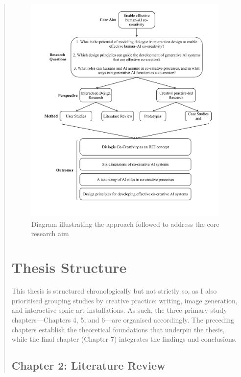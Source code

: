 \begin{quote}
\begin{figure}[hbt!]
    \centering
    \includegraphics[width=1\linewidth]{Intro - Frame 1 (2).jpg}
    \caption{Diagram illustrating the approach followed to address the core research aim}
    \label{fig:approach_figure}
\end{figure}

\clearpage

\section*{Thesis Structure}

This thesis is structured chronologically but not strictly so, as I also prioritised grouping studies by creative practice: writing, image generation, and interactive sonic art installations. As such, the three primary study chapters—Chapters 4, 5, and 6—are organised accordingly. The preceding chapters establish the theoretical foundations that underpin the thesis, while the final chapter (Chapter 7) integrates the findings and conclusions.

\subsection*{Chapter 2: Literature Review}


\end{quote}
